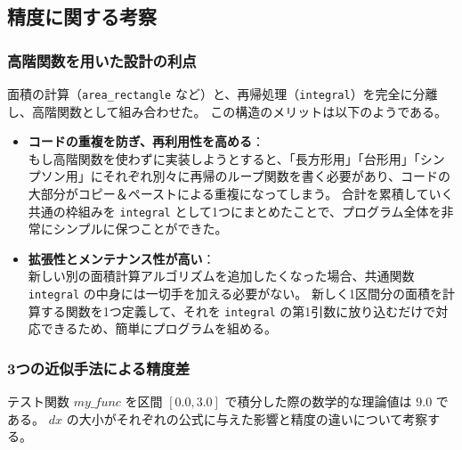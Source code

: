 \documentclass[titlepage]{ltjsarticle}
\begin{document}
\subsection{精度に関する考察}
\subsubsection{高階関数を用いた設計の利点}
面積の計算（\texttt{area\_rectangle} など）と、再帰処理（\texttt{integral}）を完全に分離し、高階関数として組み合わせた。
この構造のメリットは以下のようである。
\begin{itemize}
    \item \textbf{コードの重複を防ぎ、再利用性を高める}：\\
    もし高階関数を使わずに実装しようとすると、「長方形用」「台形用」「シンプソン用」にそれぞれ別々に再帰のループ関数を書く必要があり、コードの大部分がコピー＆ペーストによる重複になってしまう。
    合計を累積していく共通の枠組みを \texttt{integral} として1つにまとめたことで、プログラム全体を非常にシンプルに保つことができた。
    \item \textbf{拡張性とメンテナンス性が高い}：\\
    新しい別の面積計算アルゴリズムを追加したくなった場合、共通関数 \texttt{integral} の中身には一切手を加える必要がない。
    新しく1区間分の面積を計算する関数を1つ定義して、それを \texttt{integral} の第1引数に放り込むだけで対応できるため、簡単にプログラムを組める。
\end{itemize}

\subsubsection{3つの近似手法による精度差}
テスト関数 $my\_func$ を区間 $[0.0, 3.0]$ で積分した際の数学的な理論値は $9.0$ である。
$dx$ の大小がそれぞれの公式に与えた影響と精度の違いについて考察する。
\end{document}
